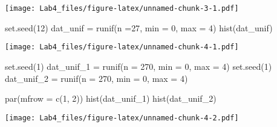 \documentclass[
]{article}
\newenvironment{Shaded}{\begin{snugshade}}{\end{snugshade}}
\newcommand{\AttributeTok}[1]{\textcolor[rgb]{0.77,0.63,0.00}{#1}}
\newcommand{\DecValTok}[1]{\textcolor[rgb]{0.00,0.00,0.81}{#1}}
\newcommand{\FunctionTok}[1]{\textcolor[rgb]{0.00,0.00,0.00}{#1}}
\newcommand{\NormalTok}[1]{#1}
\newcommand{\OtherTok}[1]{\textcolor[rgb]{0.56,0.35,0.01}{#1}}
\begin{document}
\texttt{[image: Lab4\_files/figure-latex/unnamed-chunk-3-1.pdf]}

\begin{Shaded}
\begin{Highlighting}[]
\FunctionTok{set.seed}\NormalTok{(}\DecValTok{12}\NormalTok{)}
\NormalTok{dat\_unif }\OtherTok{=} \FunctionTok{runif}\NormalTok{(}\AttributeTok{n =}\DecValTok{27}\NormalTok{, }\AttributeTok{min =} \DecValTok{0}\NormalTok{, }\AttributeTok{max =} \DecValTok{4}\NormalTok{)}
\FunctionTok{hist}\NormalTok{(dat\_unif)}
\end{Highlighting}
\end{Shaded}

\texttt{[image: Lab4\_files/figure-latex/unnamed-chunk-4-1.pdf]}

\begin{Shaded}
\begin{Highlighting}[]
\FunctionTok{set.seed}\NormalTok{(}\DecValTok{1}\NormalTok{)}
\NormalTok{dat\_unif\_1 }\OtherTok{=} \FunctionTok{runif}\NormalTok{(}\AttributeTok{n =} \DecValTok{270}\NormalTok{, }\AttributeTok{min =} \DecValTok{0}\NormalTok{, }\AttributeTok{max =} \DecValTok{4}\NormalTok{)}
\FunctionTok{set.seed}\NormalTok{(}\DecValTok{1}\NormalTok{)}
\NormalTok{dat\_unif\_2 }\OtherTok{=} \FunctionTok{runif}\NormalTok{(}\AttributeTok{n =} \DecValTok{270}\NormalTok{, }\AttributeTok{min =} \DecValTok{0}\NormalTok{, }\AttributeTok{max =} \DecValTok{4}\NormalTok{)}

\FunctionTok{par}\NormalTok{(}\AttributeTok{mfrow =} \FunctionTok{c}\NormalTok{(}\DecValTok{1}\NormalTok{, }\DecValTok{2}\NormalTok{))}
\FunctionTok{hist}\NormalTok{(dat\_unif\_1)}
\FunctionTok{hist}\NormalTok{(dat\_unif\_2)}
\end{Highlighting}
\end{Shaded}

\texttt{[image: Lab4\_files/figure-latex/unnamed-chunk-4-2.pdf]}
\end{document}

